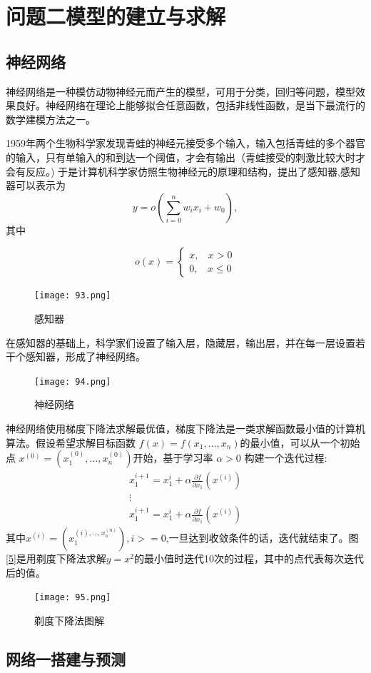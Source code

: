 \documentclass[withoutpreface,bwprint]{cumcmthesis} %
\begin{document}
\section{问题二模型的建立与求解}
\subsection{神经网络}
神经网络是一种模仿动物神经元而产生的模型，可用于分类，回归等问题，模型效果良好。神经网络在理论上能够拟合任意函数，包括非线性函数，是当下最流行的数学建模方法之一。

1959年两个生物科学家发现青蛙的神经元接受多个输入，输入包括青蛙的多个器官的输入，只有单输入的和到达一个阈值，才会有输出（青蛙接受的刺激比较大时才会有反应。)
于是计算机科学家仿照生物神经元的原理和结构，提出了感知器,感知器可以表示为$$y=o(\sum_{i=0}^{n} w_{i} x_{i}+w_0),$$其中

$$	o(x)=\left\{\begin{array}{c}
x ,~~~~x>0 \\
0, ~~~~x \leq 0
\end{array}\right.
$$
\begin{figure}[H]
	\centering
	\texttt{[image: 93.png]}
	\caption{感知器}
	\label{93}
\end{figure}
在感知器的基础上，科学家们设置了输入层，隐藏层，输出层，并在每一层设置若干个感知器，形成了神经网络。
\begin{figure}[h]
	\centering
	\texttt{[image: 94.png]}
	\caption{神经网络}
	\label{94}
\end{figure}
神经网络使用梯度下降法求解最优值，梯度下降法是一类求解函数最小值的计算机算法。假设希望求解目标函数 
$ f(x)=f(x_1,\dots ,x_n) $的最小值，可以从一个初始点 $ x^{(0)}=(x_1^{(0)},\dots ,x_n^{(0)}) $开始，基于学习率 $\alpha > 0$ 构建一个迭代过程:\begin{gather*}
x_1^{i+1}=x_1^{i}+\alpha \frac{\partial f}{\partial x_1}(x^{(i)})\\
\vdots \\
x_1^{i+1}=x_1^{i}+\alpha \frac{\partial f}{\partial x_1}(x^{(i)})
\end{gather*}	 其中$x^{(i)}=(x_1^{(i),\dots,x_n^{(n)}}),i>=0$,一旦达到收敛条件的话，迭代就结束了。图\ref{5}是用剃度下降法求解$y=x^2$的最小值时迭代10次的过程，其中的点代表每次迭代后的值。
\begin{figure}[h]
	\centering
	\texttt{[image: 95.png]}
	\caption{剃度下降法图解}
	\label{95}
\end{figure}


\subsection{网络一搭建与预测}
\end{document}
